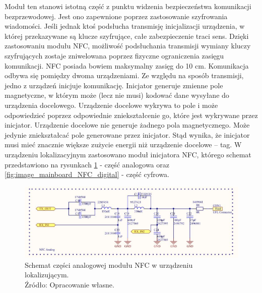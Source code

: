 Moduł ten stanowi istotną część z punktu widzenia bezpieczeństwa komunikacji bezprzewodowej. Jest ono zapewnione poprzez zastosowanie szyfrowania wiadomości. Jeśli jednak ktoś podsłucha transmisję inicjalizacji urządzenia, w której przekazywane są klucze szyfrujące, całe zabezpieczenie traci sens. Dzięki zastosowaniu modułu NFC, możliwość podsłuchania transmisji wymiany kluczy szyfrujących zostaje zniwelowana poprzez fizyczne ograniczenia zasięgu komunikacji. NFC posiada bowiem maksymalny zasięg do 10 cm.
Komunikacja odbywa się pomiędzy dwoma urządzeniami. Ze względu na sposób transmisji, jedno z urządzeń inicjuje komunikację. Inicjator generuje zmienne pole magnetyczne, w którym może (lecz nie musi) kodować dane wysyłane do urządzenia docelowego. Urządzenie docelowe wykrywa to pole i może odpowiedzieć poprzez odpowiednie zniekształcenie go, które jest wykrywane przez inicjator. Urządzenie docelowe nie generuje żadnego pola magnetycznego. Może jedynie zniekształcać pole generowane przez inicjator. Stąd wynika, że inicjator musi mieć znacznie większe zużycie energii niż urządzenie docelowe – tag. W urządzeniu lokalizacyjnym zastosowano moduł inicjatora NFC, którego schemat przedstawiono na rysunkach \ref{fig:image_mainboard_NFC_analog} - część analogowa oraz \ref{fig:image_mainboard_NFC_digital} - część cyfrowa.

\begin{figure}[H]
	\centering
	\includegraphics[width=15cm]{img/schematics/mainboard_NFC_analog.jpg}
	\caption{Schemat części analogowej modułu NFC w urządzeniu lokalizującym. \\ Źródło: Opracowanie własne.}
	\label{fig:image_mainboard_NFC_analog}
\end{figure}

